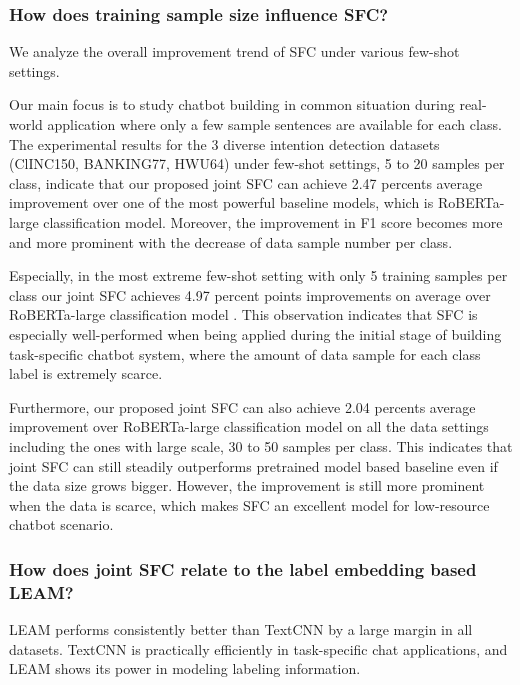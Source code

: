 \documentclass[letterpaper]{article} %
\begin{document}
  \subsubsection*{How does training sample size influence SFC?} 
  We analyze the
  overall  improvement  trend  of  SFC under various few-shot settings. 

  Our main
  focus  is  to  study  chatbot  building  in common situation during real-world
  application  where  only  a few sample sentences are available for each class.
  The  experimental  results  for  the  3  diverse  intention detection datasets
  (ClINC150,  BANKING77,  HWU64)  under  few-shot  settings, 5 to 20 samples per
  class,  indicate that our proposed joint SFC can achieve 2.47 percents average
  improvement   over  one  of  the  most  powerful  baseline  models,  which  is
  RoBERTa-large  classification  model.  Moreover,  the  improvement  in F1 score
  becomes  more  and  more prominent with the decrease of data sample number per
  class.

  Especially,  in the most extreme few-shot setting with only 5 training samples
  per  class  our joint SFC achieves 4.97 percent points improvements on average
  over  RoBERTa-large classification model . This observation indicates that SFC
  is  especially  well-performed  when being applied during the initial stage of
  building  task-specific  chatbot  system,  where the amount of data sample for
  each class label is extremely scarce.

  Furthermore,  our  proposed  joint  SFC can also achieve 2.04 percents average
  improvement  over  RoBERTa-large classification model on all the data settings
  including  the  ones  with  large  scale,  30  to  50  samples per class. This
  indicates that joint SFC can still steadily outperforms pretrained model based
  baseline even if the data size grows bigger. However, the improvement is still
  more prominent when the data is scarce, which makes SFC an excellent model for
  low-resource chatbot scenario.

  \subsubsection*{How does joint SFC relate to the label  embedding based  LEAM?}
  LEAM performs consistently better than TextCNN by a large margin in all
  datasets. TextCNN is practically efficiently in task-specific chat
  applications, and LEAM shows its power in modeling labeling information.
\end{document}
